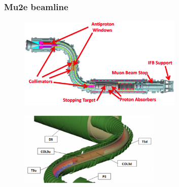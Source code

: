 \documentclass{beamer}
\begin{document}
\begin{frame}
    \frametitle{Mu2e beamline}
    \begin{figure}[!h]
        \centering
        \includegraphics[width =0.7\textwidth]{figures/png/Screenshot_20240303_152845.png}
        \label{fig:muonbeamline}
        \end{figure}
        \begin{figure}[!h]
            \centering
            \includegraphics[width =0.6\textwidth]{figures/png/800px-MuonBeamlineCollimators2.png}
            \label{fig:collimators}
            \end{figure}
    \end{frame}
\end{document}
